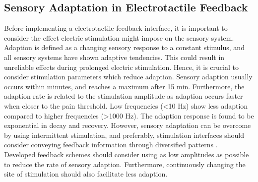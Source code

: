 \subsection{Sensory Adaptation in Electrotactile Feedback}

Before implementing a electrotactile feedback interface, it is important to consider the effect electric stimulation might impose on the sensory system. \\
Adaption is defined as a changing sensory response to a constant stimulus, and all sensory systems have shown adaptive tendencies. This could result in unreliable effects during prolonged electric stimulation. Hence, it is crucial to consider stimulation parameters which reduce adaption. Sensory adaption usually occurs within minutes, and reaches a maximum after 15 min. Furthermore, the adaption rate is related to the stimulation amplitude as adaption occurs faster when closer to the pain threshold. Low frequencies (<10 Hz) show less adaption compared to higher frequencies (>1000 Hz). The adaption response is found to be exponential in decay and recovery. \cite{Buma2007,Szeto1982} 
However, sensory adaptation can be overcome by using intermittent stimulation, and preferably, stimulation interfaces should consider conveying feedback information through diversified patterns \cite{Szeto1982,Dosen2016}. \\
Developed feedback schemes should consider using as low amplitudes as possible to reduce the rate of sensory adaption. Furthermore, continuously changing the site of stimulation should also facilitate less adaption. 



